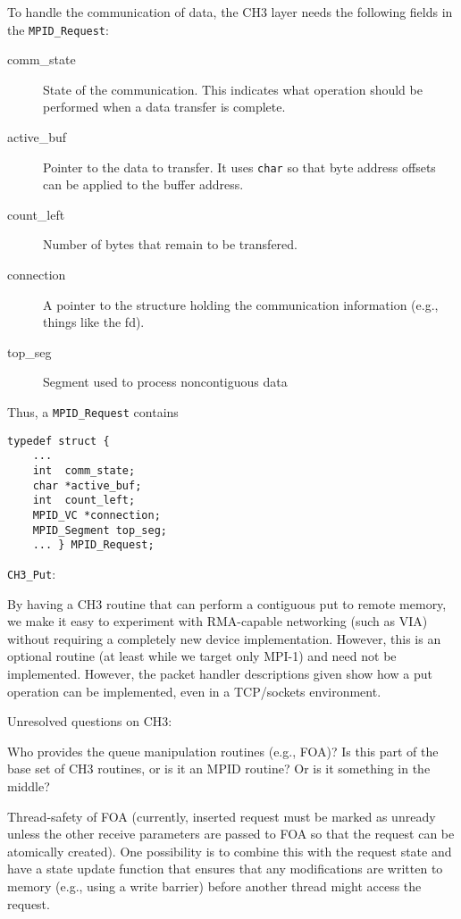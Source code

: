 \documentclass{article}
\def\code{\begingroup\makeustext\eatcode}
\def\eatcode#1{\texttt{#1}\endgroup}
\begin{document}
To handle the communication of data, the CH3 layer needs the following fields
in the \code{MPID_Request}:
\begin{description}
\item[comm\_state]State of the communication.  This indicates what operation
  should be performed when a data transfer is complete.
\item[active\_buf]Pointer to the data to transfer.  It uses \code{char} so
  that byte address offsets can be applied to the buffer address.
\item[count\_left]Number of bytes that remain to be transfered.
\item[connection]A pointer to the structure holding the communication
  information (e.g., things like the fd).
\item[top\_seg]Segment used to process noncontiguous data
\end{description}

Thus, a \code{MPID_Request} contains
\begin{verbatim}
typedef struct { 
    ...
    int  comm_state;
    char *active_buf;
    int  count_left;
    MPID_VC *connection;
    MPID_Segment top_seg;
    ... } MPID_Request;
\end{verbatim}


\code{CH3_Put}:

By having a CH3 routine that can perform a contiguous put to remote memory, we
make it easy to experiment with RMA-capable networking (such as VIA) without
requiring a completely new device implementation.  However, this is an
optional routine (at least while we target only MPI-1) and need not be
implemented.  However, the packet handler descriptions given show how a put
operation can be implemented, even in a TCP/sockets environment.

Unresolved questions on CH3:

Who provides the queue manipulation routines (e.g., FOA)?  Is this part of the
base set of CH3 routines, or is it an MPID routine?  Or is it
something in the middle?  

Thread-safety of FOA (currently, inserted request must be marked as unready
unless the other receive parameters are passed to FOA so that the request can
be atomically created).  One possibility is to combine this with the request
state and have a state update function that ensures that any modifications are
written to memory (e.g., using a write barrier) before another thread might
access the request.
\end{document}
